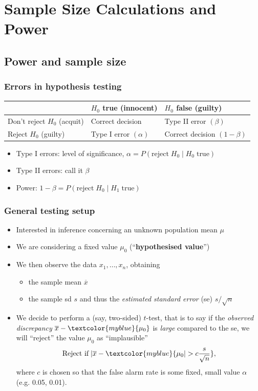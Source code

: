\documentclass[a4paper]{article}
\begin{document}
\section{Sample Size Calculations and Power}\label{sec:12}
\subsection{Power and sample size}
\subsubsection{Errors in hypothesis testing}
\begin{table}[H]
	\centering
	\begin{tabular}{@{}lll@{}}
	\toprule
	\textbf{}                       & \textbf{\( H_0 \) true (innocent)} & \textbf{\( H_0 \) false (guilty)} \\ \midrule
	Don't reject \( H_0 \) (acquit) & Correct decision                   & Type II error \( (\beta) \)       \\
	Reject \( H_0 \) (guilty)       & Type I error  \( (\alpha) \)       & Correct decision \( (1-\beta) \)  \\ \bottomrule
	\end{tabular}
\end{table}
\begin{itemize}
	\item Type I errors: level of significance, \( \alpha = P(\text{reject}\;H_0 \mid H_0\;\text{true}) \) 
	\item Type II errors: call it \( \beta \) 
	\item Power: \( 1 - \beta = P(\text{reject}\;H_0 \mid H_1\;\text{true}) \) 
\end{itemize}
\subsubsection{General testing setup}
\begin{itemize}
	\item Interested in inference concerning an unknown population mean \( \mu \)
	\item We are considering a fixed value \textcolor{myblue}{\( \mu_0 \)} (``\textcolor{myblue}{\textbf{hypothesised value}}'')
	\item We then observe the data \( x_1, \dotsc, x_n \), obtaining
	\begin{itemize}
		\item the sample mean \( \overline{x} \)
		\item the sample sd \( s \) and thus the \textit{estimated standard error} (se) \( s / \sqrt{n} \) 
	\end{itemize}
	\item We decide to perform a (say, two-sided) \( t \)-test, that is to say if the \textit{observed discrepancy} \( \overline{x} - \textcolor{myblue}{\mu_0} \)  is \textit{large} compared to the se, we will ``reject'' the value \textcolor{myblue}{\( \mu_0 \)} as ``implausible''
	\[
		\text{Reject if}\; \lvert \overline{x} - \textcolor{myblue}{\mu_0 \rvert > c  \frac{s}{\sqrt{n}}},
	\]
	where \( c \) is chosen so that the false alarm rate is some fixed, small value \( \alpha \) (e.g. 0.05, 0.01).
\end{itemize}
\end{document}
